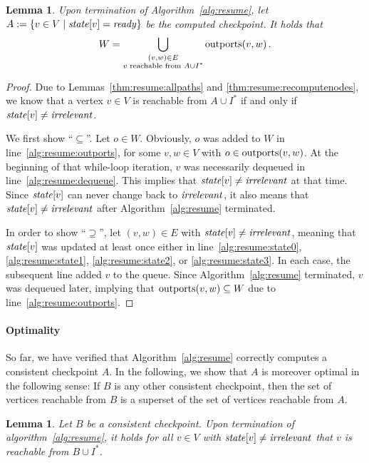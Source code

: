 \documentclass[paper=letter,fontsize=11pt,captions=tableheading]{scrartcl}
\numberwithin{equation}{section}
\newcommand{\SiM}{\mathchoice{\,}{}{}{}}
\theoremstyle{algorithm}
\theoremstyle{plain}
\newtheorem{lemma}[equation]{Lemma}
\theoremstyle{nonumberplain}
\newtheorem{proof}{Proof}
\begin{document}
\begin{lemma} \label{thm:resume:W}
	Upon termination of Algorithm~\ref{alg:resume}, let $A := \{ v \in V \mid \mathit{state}[v] = \mathit{ready}\}$ be the computed checkpoint. It holds that
	\begin{gather*}
		W = \bigcup_{\substack{(v,w) \in E\\v \text{ reachable from } A \cup I^*}} \outports(v, w)\SiM.
	\end{gather*}
\end{lemma}

\begin{proof}
	Due to Lemmas~\ref{thm:resume:allpaths} and \ref{thm:resume:recomputenodes}, we know that a vertex $v \in V$ is reachable from $A \cup I^*$ if and only if $\mathit{state}[v] \neq \mathit{irrelevant}$.

	We first show ``$\subseteq$''. Let $o \in W$. Obviously, $o$ was added to $W$ in line~\ref{alg:resume:outports}, for some $v,w \in V$ with $o \in \operatorname{outports}(v,w)$. At the beginning of that while-loop iteration, $v$ was necessarily dequeued in line~\ref{alg:resume:dequeue}. This implies that $\mathit{state}[v] \neq \mathit{irrelevant}$ at that time. Since $\mathit{state}[v]$ can never change back to $\mathit{irrelevant}$, it also means that $\mathit{state}[v] \neq \mathit{irrelevant}$ after Algorithm~\ref{alg:resume} terminated.

	In order to show ``$\supseteq$'', let $(v, w) \in E$ with $\mathit{state}[v] \neq \mathit{irrelevant}$, meaning that $\mathit{state}[v]$ was updated at least once either in line~\ref{alg:resume:state0}, \ref{alg:resume:state1}, \ref{alg:resume:state2}, or \ref{alg:resume:state3}. In each case, the subsequent line added $v$ to the queue. Since Algorithm~\ref{alg:resume} terminated, $v$ was dequeued later, implying that $\operatorname{outports}(v,w) \subseteq W$ due to line~\ref{alg:resume:outports}.
\end{proof}

\paragraph{Optimality}

So far, we have verified that Algorithm~\ref{alg:resume} correctly computes a consistent checkpoint $A$. In the following, we show that $A$ is moreover optimal in the following sense: If $B$ is any other consistent checkpoint, then the set of vertices reachable from $B$ is a superset of the set of vertices reachable from $A$.

\begin{lemma} \label{thm:resume:optimal}
	Let $B$ be a consistent checkpoint. Upon termination of algorithm~\ref{alg:resume}, it holds for all $v \in V$ with $\mathit{state}[v] \neq \mathit{irrelevant}$ that $v$ is reachable from $B \cup I^*$.
\end{lemma}
\end{document}
